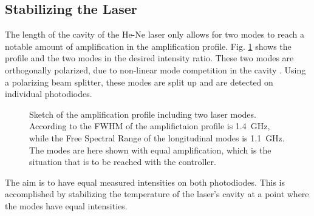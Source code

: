 \documentclass[a4paper,10pt]{article}
\begin{document}
\subsection{Stabilizing the Laser}
The length of the cavity of the He-Ne laser only allows for two modes to reach a notable amount of amplification in the amplification profile. Fig. \ref{fig_profile} shows the profile and the two modes in the desired intensity ratio. These two modes are orthogonally polarized, due to non-linear mode competition in the cavity \cite{laserfaq}. Using a polarizing beam splitter, these modes are split up and are detected on individual photodiodes.

\begin{figure}[htp!]
  \centering
  \caption{Sketch of the amplification profile including two laser modes. According to \cite{script} the FWHM of the amplifictaion profile is \SI{1.4}{\giga \hertz}, while the Free Spectral Range of the longitudinal modes is \SI{1.1}{\giga \hertz}. The modes are here shown with equal amplification, which is the situation that is to be reached with the controller.}
  \label{fig_profile}
\end{figure}
The aim is to have equal measured intensities on both photodiodes. This is accomplished by stabilizing the temperature of the laser's cavity at a point where the modes have equal intensities.
\end{document}
